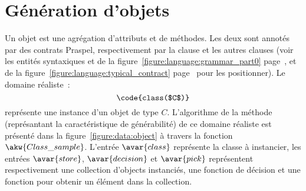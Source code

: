 \section{Génération d'objets}
\label{section:data:objects}

Un objet est une agrégation d'attributs et de méthodes. Les deux sont annotés
par des contrats Praspel, respectivement par la clause \ainvariant et les autres
clauses (voir les entités syntaxiques  et
 de la figure~\ref{figure:language:grammar_part0}
page~\pageref{figure:language:grammar_part0}, et de la
figure~\ref{figure:language:typical_contract}
page~\pageref{figure:language:typical_contract} pour les positionner). Le
domaine réaliste~:
%
$$\code{class($C$)}$$
%
représente une instance d'un objet de type $C$. L'algorithme de la méthode
 (représantant la caractéristique de générabilité) de ce domaine
réaliste est présenté dans la figure~\ref{figure:data:object} à travers la
fonction $\akw{Class\_sample}$. L'entrée $\avar{class}$ représente la classe à
instancier, les entrées $\avar{store}$, $\avar{decision}$ et $\avar{pick}$
représentent respectivement une collection d'objects instanciés, une fonction
de décision et une fonction pour obtenir un élément dans la collection.
%
